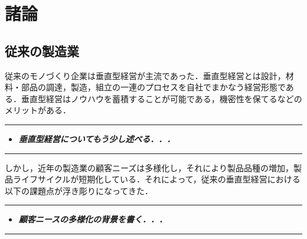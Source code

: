 \hypertarget{ux8af8ux8ad6}{%
\chapter{諸論}\label{ux8af8ux8ad6}}

\hypertarget{ux5f93ux6765ux306eux88fdux9020ux696d}{%
\section{従来の製造業}\label{ux5f93ux6765ux306eux88fdux9020ux696d}}

従来のモノづくり企業は垂直型経営が主流であった\cite{Suichoku}．垂直型経営とは設計，材料・部品の調達，製造，組立の一連のプロセスを自社でまかなう経営形態である．垂直型経営はノウハウを蓄積することが可能である，機密性を保てるなどのメリットがある．

\begin{center}\rule{1.0\linewidth}{0.5pt}\end{center}

\begin{itemize}
\tightlist
\item
  \textbf{\emph{垂直型経営についてもう少し述べる．．．}}
\end{itemize}

\begin{center}\rule{1.0\linewidth}{0.5pt}\end{center}

しかし，近年の製造業の顧客ニーズは多様化し，それにより製品品種の増加，製品ライフサイクルが短期化している．それによって，従来の垂直型経営における以下の課題点が浮き彫りになってきた．

\begin{center}\rule{1.0\linewidth}{0.5pt}\end{center}

\begin{itemize}
\tightlist
\item
  \textbf{\emph{顧客ニースの多様化の背景を書く．．．}}
\end{itemize}

\begin{center}\rule{1.0\linewidth}{0.5pt}\end{center}

